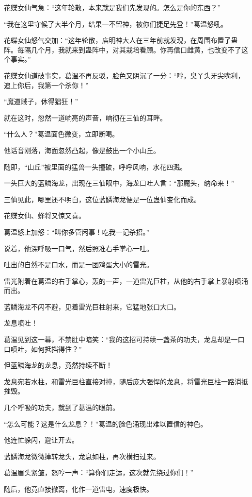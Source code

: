 \begin{this_body}
花蝶女仙气急：“这年轮散，本来就是我们先发现的。怎么是你的东西？”

“我在这里守候了大半个月，结果一不留神，被你们捷足先登！”葛温怒吼。

花蝶女仙怒气交加：“这年轮散，庙明神大人在三年前就发现，在周围布置了蛊阵。每隔几个月，我就来到蛊阵中，对其栽培看顾。你再信口雌黄，也改变不了这个事实。”

花蝶女仙道破事实，葛温不再反驳，脸色又阴沉了一分：“哼，臭丫头牙尖嘴利，追上你后，我第一个杀你！”

“魔道贼子，休得猖狂！”

就在这时，忽然一道响亮的声音，响彻在三仙的耳畔。

“什么人？”葛温面色微变，立即断喝。

他话音刚落，海面忽然凸起，像是鼓出一个小山丘。

随即，“山丘”被里面的猛兽一头撞破，呼呼风响，水花四溅。

一头巨大的蓝鳞海龙，出现在三仙眼中，海龙口吐人言：“那魔头，纳命来！”

三仙见此，哪里还不明白，这位蓝鳞海龙便是一位蛊仙变化而成。

花蝶女仙、蜂将又惊又喜。

葛温怒上加怒：“叫你多管闲事！吃我一记杀招。”

说着，他深呼吸一口气，然后照准右手掌心一吐。

吐出的自然不是口水，而是一团鸡蛋大小的雷光。

雷光附着在葛温的右手掌心，轰的一声，一道雷光巨柱，从他的右手掌上暴射喷涌而出。

蓝鳞海龙不闪不避，见着雷光巨柱射来，它猛地张口大口。

龙息喷吐！

葛温见到这一幕，不禁肚中暗笑：“我的这招可持续一盏茶的功夫，龙息却是一口口喷吐，如何抵挡得住？”

但蓝鳞海龙的龙息，竟然持续不断！

龙息宛若水柱，和雷光巨柱直接对撞，随后庞大强悍的龙息，将雷光巨柱一路消抵摧毁。

几个呼吸的功夫，就到了葛温的眼前。

“怎么可能？这是什么龙息？！”葛温的脸色涌现出难以置信的神色。

他连忙躲闪，避让开去。

蓝鳞海龙微微掉转龙头，龙息如柱，再次横扫过来。

葛温眉头紧皱，怒哼一声：“算你们走运，这次就先绕过你们！”

随后，他竟直接撤离，化作一道雷电，速度极快。


\end{this_body}
